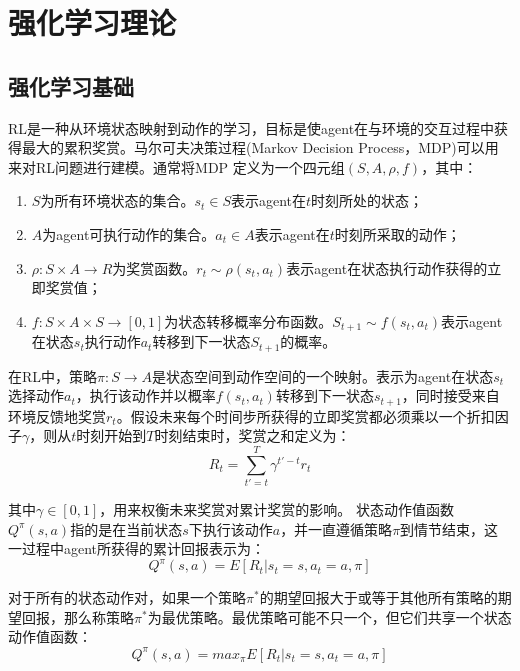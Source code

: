 \documentclass[bachelor]{thesis-uestc}
\begin{document}
	\chapter{强化学习理论}
	\section{强化学习基础}
	RL是一种从环境状态映射到动作的学习，目标是使agent在与环境的交互过程中获得最大的累积奖赏。马尔可夫决策过程(Markov Decision Process，MDP)可以用来对RL问题进行建模。通常将MDP 定义为一个四元组$(S,A,\rho,f)$，其中：
	
	\begin{enumerate}
		\item $S$为所有环境状态的集合。$s_t\in S$表示agent在$t$时刻所处的状态；
		\item $A$为agent可执行动作的集合。$a_t\in A$表示agent在$t$时刻所采取的动作；
		\item $\rho:S\times A\rightarrow R$为奖赏函数。$r_t\sim \rho(s_t,a_t)$表示agent在状态执行动作获得的立即奖赏值；
		\item $f:S\times A\times S\rightarrow [0,1]$为状态转移概率分布函数。$S_{t+1}\sim f(s_t,a_t)$表示agent在状态$s_t$执行动作$a_t$转移到下一状态$S_{t+1}$的概率。
	\end{enumerate}
	
	在RL中，策略$\pi :S\rightarrow A$是状态空间到动作空间的一个映射。表示为agent在状态$s_t$选择动作$a_t$，执行该动作并以概率$f(s_t,a_t)$转移到下一状态$s_{t+1}$，同时接受来自环境反馈地奖赏$r_t$。假设未来每个时间步所获得的立即奖赏都必须乘以一个折扣因子$\gamma$，则从$t$时刻开始到$T$时刻结束时，奖赏之和定义为：
	\begin{equation}\label{eq1}
	R_t=\sum^T_{t'=t}\gamma^{t'-t}r_t
	\end{equation}
	
	其中$\gamma\in [0,1]$，用来权衡未来奖赏对累计奖赏的影响。
	状态动作值函数$Q^\pi (s,a)$指的是在当前状态$s$下执行该动作$a$，并一直遵循策略$\pi$到情节结束，这一过程中agent所获得的累计回报表示为：
	\begin{equation}\label{eq2}
	Q^\pi (s,a)=E[R_t|s_t=s,a_t=a,\pi]
	\end{equation}
	
	对于所有的状态动作对，如果一个策略$\pi ^*$的期望回报大于或等于其他所有策略的期望回报，那么称策略$\pi ^*$为最优策略。最优策略可能不只一个，但它们共享一个状态动作值函数：
	\begin{equation}\label{eq3}
	Q^\pi (s,a)=max_\pi E[R_t|s_t=s,a_t=a,\pi]
	\end{equation}
	
\end{document}

